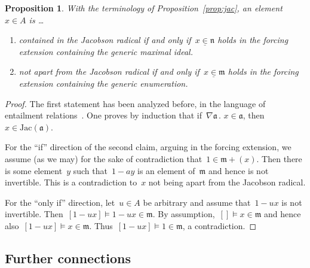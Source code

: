 \documentclass[com,11pt,crcready]{iosart2x}
\theoremstyle{definition}
\theoremstyle{plain}
\newtheorem{proposition}[definition]{Proposition}
\theoremstyle{remark}
\newcommand{\?}{\,{:}\,}
\newcommand{\aaa}{\mathfrak{a}}
\newcommand{\mmm}{\mathfrak{m}}
\newcommand{\nnn}{\mathfrak{n}}
\renewcommand{\_}{\mathpunct{.}\,}
\begin{document}
\begin{proposition}\label{prop:mmm-nnn}With the terminology of
Proposition~\ref{prop:jac}, an element~$x \in A$ is \ldots \begin{enumerate}
\item[(a)] contained in the Jacobson radical if and only if~$x
\mathrel{\underline{\in}} \nnn$ holds in the forcing extension containing the
generic maximal ideal.
\item[(b)] not apart from the Jacobson radical if and only if~$x
\mathrel{\underline{\in}} \mmm$ holds in the forcing extension containing the
generic enumeration.
\end{enumerate}
\end{proposition}

\begin{proof}The first statement has been analyzed before, in the language of
entailment relations~\cite[Corollary~2]{schuster-wessel:krull}. One proves by
induction that if~$\nabla\aaa\_ x \in \aaa$, then~$x \in \mathrm{Jac}(\aaa)$.

For the ``if'' direction of the second claim, arguing in the forcing extension,
we assume (as we may) for the sake of contradiction that~$1 \in \mmm + (x)$.
Then there is some element~$y$ such that~$1 - ay$ is an element of~$\mmm$ and
hence is not invertible. This is a contradiction to~$x$ not being apart from
the Jacobson radical.

For the ``only if'' direction, let~$u \in A$ be arbitrary and assume that~$1 -
ux$ is not invertible. Then~$[1-ux] \models 1-ux \in \mmm$. By assumption,~$[]
\models x \in \mmm$ and hence also~$[1-ux] \models x \in \mmm$. Thus~$[1-ux]
\models 1 \in \mmm$, a contradiction.
\end{proof}

\color{black}


\subsection{Further connections}
\end{document}
